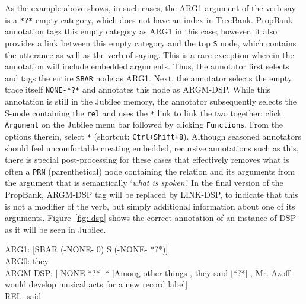 \documentclass[11pt]{report}
\begin{document}
\noindent As the example above shows, in such cases, the ARG1 argument of the verb say is a \texttt{*?*} empty category, which does not have an index in TreeBank. PropBank annotation tags this empty category as ARG1 in this case; however, it also provides a link between this empty category and the top \texttt{S} node, which contains the utterance as well as the verb of saying. This is a rare exception wherein the annotation will include embedded arguments.  Thus, the annotator first selects and tags the entire \texttt{SBAR} node as ARG1.  Next, the annotator selects the empty trace itself \texttt{NONE-*?*} and annotates this node as ARGM-DSP.  While this annotation is still in the Jubilee memory, the annotator subsequently selects the S-node containing the \texttt{rel} and uses the \texttt{*} link to link the two together: click {\tt Argument} on the Jubilee menu bar followed by clicking {\tt Functions}.  From the options therein, select \texttt{*} (shortcut: \texttt{Ctrl+Shift+8}).  Although seasoned annotators should feel uncomfortable creating embedded, recursive annotations such as this, there is special post-processing for these cases that effectively removes what is often a \texttt{PRN} (parenthetical) node containing the relation and its arguments from the argument that is semantically `\textit{what is spoken}.'   In the final version of the PropBank, ARGM-DSP tag will be replaced by LINK-DSP, to indicate that this is not a modifier of the verb, but simply additional information about one of its arguments. Figure~\ref{fig: dsp} shows the correct annotation of an instance of DSP as it will be seen in Jubilee. 

ARG1:      [SBAR (-NONE- 0) S (-NONE- *?*)]\\
ARG0:       they\\
ARGM-DSP: [-NONE-*?*] * [Among other things , they said  [*?*] , Mr. Azoff would develop musical acts for a new record label]\\    
REL:        said
\end{document}

